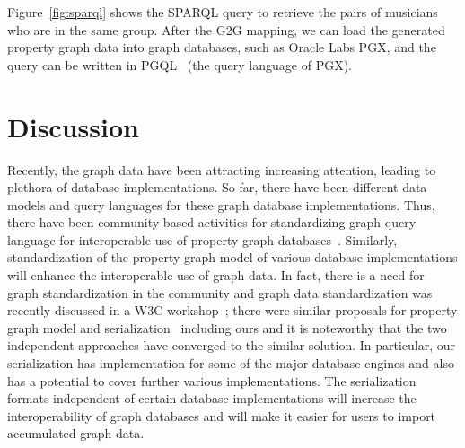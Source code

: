 \documentclass[runningheads]{llncs}
\begin{document}
Figure~\ref{fig:sparql} shows the SPARQL query to retrieve the pairs of musicians who are in the same group. After the G2G mapping, we can load the generated property graph data into graph databases, such as Oracle Labs PGX, and the query can be written in PGQL~\cite{pgql} (the query language of PGX).

\section{Discussion}
Recently, the graph data have been attracting increasing attention, leading to plethora of database implementations. 
So far, there have been different data models and query languages for these graph database implementations.
Thus, there have been community-based activities for standardizing graph query language for interoperable use of property graph databases~\cite{angles3}. Similarly, standardization of the property graph model of various database implementations will enhance the interoperable use of graph data. In fact, there is a need for graph standardization in the community and graph data standardization was recently discussed in a W3C workshop~\cite{w3c}; there were similar proposals for property graph model and serialization~\cite{tomaszuk} including ours and it is noteworthy that the two independent approaches have converged to the similar solution. 
In particular, our serialization has implementation for some of the major database engines and also has a potential to cover further various implementations. %
The serialization formats independent of certain database implementations will increase the interoperability of graph databases and will make it easier for users to import accumulated graph data.
\end{document}
